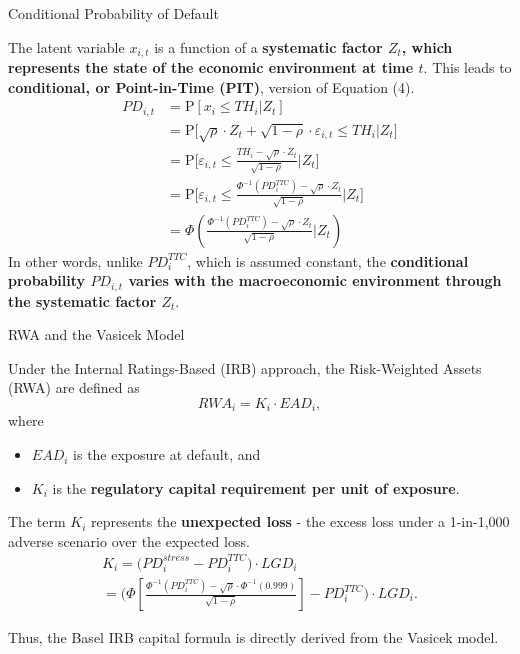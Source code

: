 \documentclass{beamer}
\begin{document}
\begin{frame}{Conditional Probability of Default}
\justifying
\small

The latent variable $x_{i, t}$ is a function of a \textbf{systematic factor $Z_t$, which represents the state of the economic environment at time $t$}. This leads to \textbf{conditional, or Point-in-Time (PIT)}, version of Equation (4).
{\tiny
\begin{align}
PD_{i, t} &= \mathrm{P}[x_i \le TH_i | Z_t] \nonumber \\
&= \mathrm{P}\Bigg[\sqrt{\rho} \cdot Z_t + \sqrt{1 - \rho} \cdot \varepsilon_{i,t} \le TH_i | Z_t \Bigg] \nonumber \\
&= \mathrm{P}\Bigg[\varepsilon_{i,t} \le \frac{TH_i - \sqrt{\rho} \cdot Z_t}{\sqrt{1 - \rho}} | Z_t\Bigg] \nonumber \\
&= \mathrm{P}\Bigg[\varepsilon_{i,t} \le \frac{\Phi^{-1}(PD_i^{TTC}) - \sqrt{\rho} \cdot Z_t}{\sqrt{1 - \rho}} | Z_t\Bigg] \nonumber \\
&= \Phi\left(\frac{\Phi^{-1}(PD_i^{TTC}) - \sqrt{\rho} \cdot Z_t}{\sqrt{1 - \rho}} | Z_t \right)
\end{align}
}
In other words, unlike $PD_i^{TTC}$, which is assumed constant, the \textbf{conditional probability $PD_{i,t}$ varies with the macroeconomic environment through the systematic factor $Z_t$}.

\end{frame}

\begin{frame}{RWA and the Vasicek Model}
\justifying
\small

Under the Internal Ratings-Based (IRB) approach, the Risk-Weighted Assets (RWA) are defined as
\begin{equation*}
\textit{RWA}_i = K_i \cdot EAD_i,
\end{equation*}
where
\begin{itemize}
\item $EAD_i$ is the exposure at default, and
\item $K_i$ is the \textbf{regulatory capital requirement per unit of exposure}.
\end{itemize}

\medskip

The term $K_i$ represents the \textbf{unexpected loss} - the excess loss under a 1-in-1,000 adverse scenario over the expected loss.
{\tiny
\begin{multline*}
K_i
= \big(PD_i^{stress} - PD_i^{TTC}\big) \cdot LGD_i \\
= \Bigg(\Phi \left[\frac{\Phi^{-1}(PD_i^{TTC}) - \sqrt{\rho} \cdot \Phi^{-1}(0.999)}{\sqrt{1 - \rho}}\right] - PD_i^{TTC}\Bigg) \cdot LGD_i.
\end{multline*}
}

\medskip

Thus, the Basel IRB capital formula is directly derived from the Vasicek model.
\end{frame}
\end{document}
